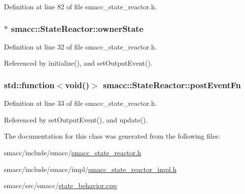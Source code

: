 Definition at line 82 of file smacc\+\_\+state\+\_\+reactor.\+h.

\subsubsection[{\texorpdfstring{owner\+State}{ownerState}}]{$\ast$ smacc\+::\+State\+Reactor\+::owner\+State}\hypertarget{classsmacc_1_1StateReactor_aabd30af9412a8fea9ec5906f173d9d4a}{}\label{classsmacc_1_1StateReactor_aabd30af9412a8fea9ec5906f173d9d4a}


Definition at line 32 of file smacc\+\_\+state\+\_\+reactor.\+h.



Referenced by initialize(), and set\+Output\+Event().

\subsubsection[{\texorpdfstring{post\+Event\+Fn}{postEventFn}}]{\setlength{\rightskip}{0pt plus 5cm}std\+::function$<$void()$>$ smacc\+::\+State\+Reactor\+::post\+Event\+Fn}\hypertarget{classsmacc_1_1StateReactor_a1d97ae5c1689b6716c60c19c94a7eeae}{}\label{classsmacc_1_1StateReactor_a1d97ae5c1689b6716c60c19c94a7eeae}


Definition at line 33 of file smacc\+\_\+state\+\_\+reactor.\+h.



Referenced by set\+Output\+Event(), and update().



The documentation for this class was generated from the following files\+:\begin{DoxyCompactItemize}
\item 
smacc/include/smacc/\hyperlink{smacc__state__reactor_8h}{smacc\+\_\+state\+\_\+reactor.\+h}\item 
smacc/include/smacc/impl/\hyperlink{smacc__state__reactor__impl_8h}{smacc\+\_\+state\+\_\+reactor\+\_\+impl.\+h}\item 
smacc/src/smacc/\hyperlink{state__behavior_8cpp}{state\+\_\+behavior.\+cpp}\end{DoxyCompactItemize}

